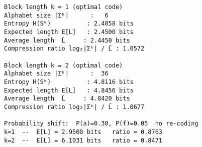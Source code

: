 \begin{lstlisting}[caption={Program output},label={lst:output}]
Block length k = 1 (optimal code)
Alphabet size |Σᵏ|      :   6
Entropy H(Sᵏ)          : 2.4058 bits
Expected length E[L]   : 2.4500 bits
Average length  L̄     : 2.4450 bits
Compression ratio log₂|Σᵏ| / L̄ : 1.0572

Block length k = 2 (optimal code)
Alphabet size |Σᵏ|      :  36
Entropy H(Sᵏ)          : 4.8116 bits
Expected length E[L]   : 4.8456 bits
Average length  L̄     : 4.8420 bits
Compression ratio log₂|Σᵏ| / L̄ : 1.0677

Probability shift:  P(a)=0.30, P(f)=0.05  no re-coding
k=1  --  E[L] = 2.9500 bits   ratio = 0.8763
k=2  --  E[L] = 6.1031 bits   ratio = 0.8471
\end{lstlisting}